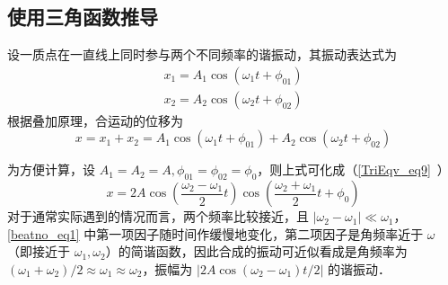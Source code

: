 
\subsection{使用三角函数推导}
设一质点在一直线上同时参与两个不同频率的谐振动，其振动表达式为
\begin{equation}
\begin{array}{l}x_{1}=A_{1} \cos \left(\omega_{1} t+\phi_{01}\right) \\ x_{2}=A_{2} \cos \left(\omega_{2} t+\phi_{02}\right)\end{array}
\end{equation}
根据叠加原理，合运动的位移为
\begin{equation}
x=x_{1}+x_{2}=A_{1} \cos \left(\omega_{1} t+\phi_{01}\right)+A_{2} \cos \left(\omega_{2} t+\phi_{02}\right)
\end{equation}

为方便计算，设 $A_1=A_2=A,\phi_{01}=\phi_{02}=\phi_{0}$，则上式可化成（\autoref{TriEqv_eq9}~）
\begin{equation} \label{beatno_eq1}
x=2 A \cos \left(\frac{\omega_{2}-\omega_{1}}{2} t\right) \cos \left(\frac{\omega_{2}+\omega_{1}}{2} t+\phi_{0}\right)
\end{equation}
对于通常实际遇到的情况而言，两个频率比较接近，且 $\left|\omega_{2}-\omega_{1}\right|\ll \omega_1$，\autoref{beatno_eq1} 中第一项因子随时间作缓慢地变化，第二项因子是角频率近于 $\omega$（即接近于 $\omega_1,\omega_2$）的简谐函数，因此合成的振动可近似看成是角频率为 $(\omega_{1}+\omega_{2})/2 \approx \omega_{1} \approx \omega_{2}$，振幅为 $\left | 2 A \cos (\omega_{2}-\omega_{1})t/{2} \right |$ 的谐振动．

